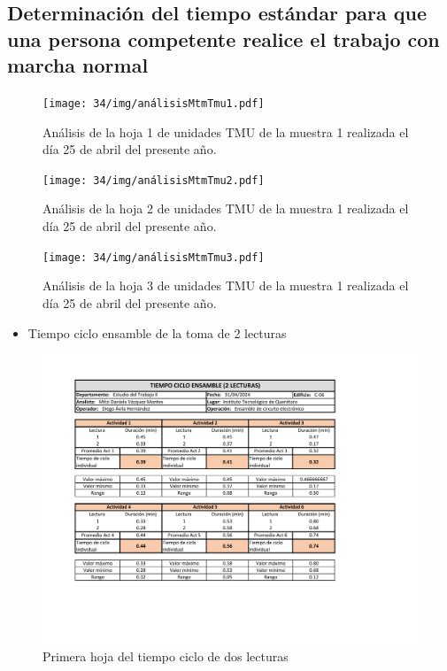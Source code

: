     \subsection{Determinación del tiempo estándar para que una persona competente realice el trabajo con marcha normal}
    
    \begin{figure}[H]
        \centering
        \texttt{[image: 34/img/análisisMtmTmu1.pdf]}
        \caption{Análisis de la hoja 1 de unidades TMU de la muestra 1 realizada el día 25 de abril del presente año.}
        \label{fig:análisisMtmTmu1}
    \end{figure}
    
    \begin{figure}[H]
        \centering
        \texttt{[image: 34/img/análisisMtmTmu2.pdf]}
        \caption{Análisis de la hoja 2 de unidades TMU de la muestra 1 realizada el día 25 de abril del presente año.}
        \label{fig:análisisMtmTmu2}
    \end{figure}
    
    \begin{figure}[H]
        \centering
        \texttt{[image: 34/img/análisisMtmTmu3.pdf]}
        \caption{Análisis de la hoja 3 de unidades TMU de la muestra 1 realizada el día 25 de abril del presente año.}
        \label{fig:análisisMtmTmu3}
    \end{figure}
    \begin{itemize}
        \item Tiempo ciclo ensamble de la toma de 2 lecturas
    \end{itemize}
    
    \begin{figure}[H]
        \centering
        \includegraphics[trim = {1mm 1mm 1mm 1mm},clip,scale=0.45]{34/img/tiempoCicloEnsamble2Lecturas1.pdf}
        \caption{Primera hoja del tiempo ciclo de dos lecturas}
        \label{fig:tiempoCicloEnsamble2Lecturas1}
    \end{figure}
    
